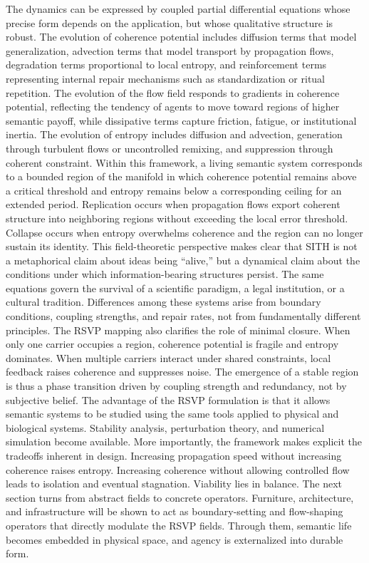 \documentclass[11pt,oneside]{article}
\begin{document}
The dynamics can be expressed by coupled partial differential equations whose precise form depends on the application, but whose qualitative structure is robust. The evolution of coherence potential includes diffusion terms that model generalization, advection terms that model transport by propagation flows, degradation terms proportional to local entropy, and reinforcement terms representing internal repair mechanisms such as standardization or ritual repetition. The evolution of the flow field responds to gradients in coherence potential, reflecting the tendency of agents to move toward regions of higher semantic payoff, while dissipative terms capture friction, fatigue, or institutional inertia. The evolution of entropy includes diffusion and advection, generation through turbulent flows or uncontrolled remixing, and suppression through coherent constraint.
Within this framework, a living semantic system corresponds to a bounded region of the manifold in which coherence potential remains above a critical threshold and entropy remains below a corresponding ceiling for an extended period. Replication occurs when propagation flows export coherent structure into neighboring regions without exceeding the local error threshold. Collapse occurs when entropy overwhelms coherence and the region can no longer sustain its identity.
This field-theoretic perspective makes clear that SITH is not a metaphorical claim about ideas being “alive,” but a dynamical claim about the conditions under which information-bearing structures persist. The same equations govern the survival of a scientific paradigm, a legal institution, or a cultural tradition. Differences among these systems arise from boundary conditions, coupling strengths, and repair rates, not from fundamentally different principles.
The RSVP mapping also clarifies the role of minimal closure. When only one carrier occupies a region, coherence potential is fragile and entropy dominates. When multiple carriers interact under shared constraints, local feedback raises coherence and suppresses noise. The emergence of a stable region is thus a phase transition driven by coupling strength and redundancy, not by subjective belief.
The advantage of the RSVP formulation is that it allows semantic systems to be studied using the same tools applied to physical and biological systems. Stability analysis, perturbation theory, and numerical simulation become available. More importantly, the framework makes explicit the tradeoffs inherent in design. Increasing propagation speed without increasing coherence raises entropy. Increasing coherence without allowing controlled flow leads to isolation and eventual stagnation. Viability lies in balance.
The next section turns from abstract fields to concrete operators. Furniture, architecture, and infrastructure will be shown to act as boundary-setting and flow-shaping operators that directly modulate the RSVP fields. Through them, semantic life becomes embedded in physical space, and agency is externalized into durable form.
\end{document}
